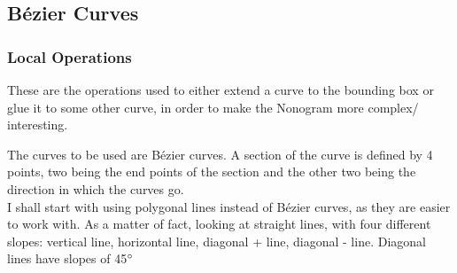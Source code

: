 \documentclass{article}
\begin{document}
\subsection{Bézier Curves}

\subsubsection[]{Local Operations}
These are the operations used to either extend a curve to the bounding box or glue it to some other curve, in order to make the Nonogram more complex/ interesting.





The curves to be used are Bézier curves. A section of the curve is defined by 4 points, two being the end points of the section and the other two being the direction in which the curves go.\\

I shall start with using polygonal lines instead of Bézier curves, as they are easier to work with. As a matter of fact, looking at straight lines, with four different slopes: vertical line, horizontal line, diagonal + line, diagonal - line. Diagonal lines have slopes of 45$\degree$ 
 
\end{document}
